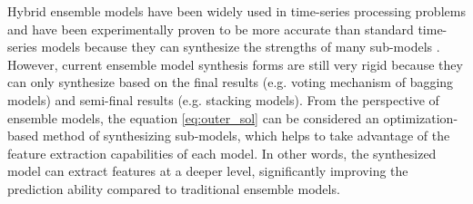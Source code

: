 Hybrid ensemble models have been widely used in time-series processing problems and have been experimentally proven to be more accurate than standard time-series models because they can synthesize the strengths of many sub-models \cite{ayitey2023forex}. However, current ensemble model synthesis forms are still very rigid because they can only synthesize based on the final results (e.g. voting mechanism of bagging models) and semi-final results (e.g. stacking models). From the perspective of ensemble models, the equation \ref{eq:outer_sol} can be considered an optimization-based method of synthesizing sub-models, which helps to take advantage of the feature extraction capabilities of each model. In other words, the synthesized model can extract features at a deeper level, significantly improving the prediction ability compared to traditional ensemble models.

